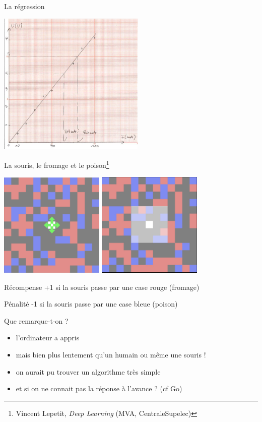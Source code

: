\documentclass{beamer}
\begin{document}
\begin{frame}{La régression}

\includegraphics[width=7cm]{images/droite.jpg}
\end{frame}


\begin{frame}{La souris, le fromage et le poison\footnote{{\scriptsize Vincent Lepetit, \textit{Deep Learning} (MVA, CentraleSupelec)}}}

\includegraphics[width=5cm]{images/board.jpeg} \includegraphics[width=5cm]{images/visu.jpeg}

Récompense +1 si la souris passe par une case rouge (fromage)

Pénalité -1 si la souris passe par une case bleue (poison)

\end{frame}

\begin{frame}

Que remarque-t-on ?

\begin{itemize}
\item l'ordinateur a appris
\item mais bien plus lentement qu'un humain ou même une souris !
\item on aurait pu trouver un algorithme très simple
\item et si on ne connait pas la réponse à l'avance ? (cf Go)
\end{itemize}

\end{frame}



\end{document}
